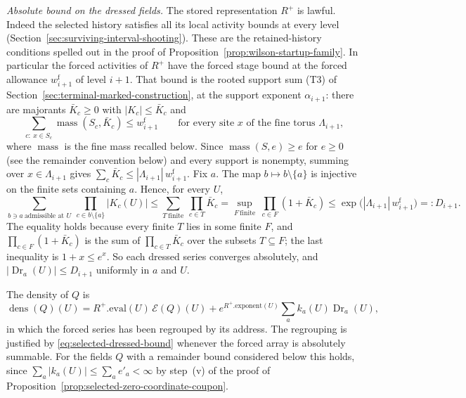 \emph{Absolute bound on the dressed fields.} The stored representation
$R^+$ is lawful. Indeed the selected history satisfies all its local
activity bounds at every level
(Section~\ref{sec:surviving-interval-shooting}). These are the
retained-history conditions spelled out in the proof of
Proposition~\ref{prop:wilson-startup-family}. In particular the forced
activities of $R^+$ have the forced stage bound at the forced allowance
$w^{\mathrm f}_{i+1}$ of level $i+1$. That bound is the rooted support
sum (T3) of Section~\ref{sec:terminal-marked-construction}, at the
support exponent $\alpha_{i+1}$: there are majorants $\bar K_c\ge0$
with $|K_c|\le\bar K_c$ and
\[
 \sum_{c:\ x\in S_c}\operatorname{mass}(S_c,\bar K_c)\le w^{\mathrm f}_{i+1}
 \qquad\text{for every site $x$ of the fine torus $\Lambda_{i+1}$,}
\]
where $\operatorname{mass}$ is the fine mass recalled below. Since
$\operatorname{mass}(S,e)\ge e$ for $e\ge0$ (see the remainder
convention below) and every support is nonempty, summing over
$x\in\Lambda_{i+1}$ gives
$\sum_c\bar K_c\le|\Lambda_{i+1}|\,w^{\mathrm f}_{i+1}$. Fix $a$. The map
$b\mapsto b\setminus\{a\}$ is injective on the finite sets containing
$a$. Hence, for every $U$,
\begin{equation}\label{eq:selected-dressed-bound}
 \sum_{b\ni a\ \text{admissible at }U}\ \prod_{c\in b\setminus\{a\}}|K_c(U)|
 \le\sum_{T\ \text{finite}}\ \prod_{c\in T}\bar K_c
 =\sup_{F\ \text{finite}}\ \prod_{c\in F}(1+\bar K_c)
 \le\exp\bigl(|\Lambda_{i+1}|\,w^{\mathrm f}_{i+1}\bigr)=:D_{i+1}.
\end{equation}
The equality holds because every finite $T$ lies in some finite $F$,
and $\prod_{c\in F}(1+\bar K_c)$ is the sum of
$\prod_{c\in T}\bar K_c$ over the subsets $T\subseteq F$; the last
inequality is $1+x\le e^x$. So each dressed series converges absolutely,
and $|\operatorname{Dr}_a(U)|\le D_{i+1}$ uniformly in $a$ and $U$.

The density of $Q$ is
\[
 \operatorname{dens}(Q)(U)=R^+.\mathrm{eval}(U)\,\mathcal E(Q)(U)
   +e^{R^+.\mathrm{exponent}(U)}\sum_a k_a(U)\operatorname{Dr}_a(U),
\]
in which the forced series has been regrouped by its address. The
regrouping is justified by \eqref{eq:selected-dressed-bound}
whenever the forced array is absolutely summable. For the fields $Q$
with a remainder bound considered below this holds, since
$\sum_a|k_a(U)|\le\sum_ae'_a<\infty$ by step~(v) of the proof of
Proposition~\ref{prop:selected-zero-coordinate-coupon}.

